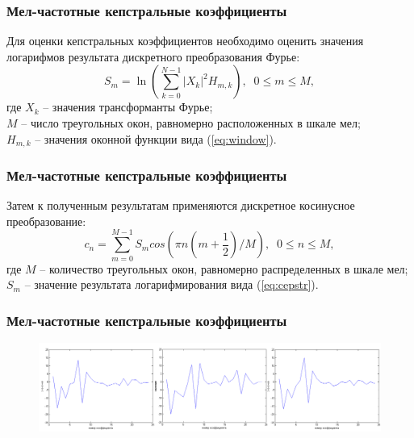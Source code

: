 \documentclass[slidestop, compress, mathserif, blackandwhite, utf8, serif, slidescentered]{beamer}
\begin{document}
 \begin{frame}[plain]
 	\frametitle{Мел-частотные кепстральные коэффициенты}
	Для оценки кепстральных коэффициентов необходимо оценить значения логарифмов результата дискретного преобразования Фурье:
	\begin{equation}
		S_m=\ln(\sum_{k=0}^{N-1}|X_k|^2 H_{m,k}), \; \; 0\leq m \le M,
		\label{eq:cepstr}
	\end{equation}
	где $X_k$ -- значения трансформанты Фурье;\\
	$M$ -- число треугольных окон, равномерно расположенных в шкале мел;\\
	$H_{m,k}$ -- значения оконной функции вида (\ref{eq:window}).

 \end{frame}

 \begin{frame}[plain]
 	\frametitle{Мел-частотные кепстральные коэффициенты}
	Затем к полученным результатам применяются дискретное косинусное преобразование:
	\begin{equation}
		c_n=\sum_{m=0}^{M-1}S_m cos(\pi n(m+\frac{1}{2})/M), \; \; 0\leq n \le M,
	\end{equation}
	где  $M$ – количество треугольных окон, равномерно распределенных в шкале мел;\\
	$S_m$ – значение результата логарифмирования вида (\ref{eq:cepstr}).

 \end{frame}

 \begin{frame}[plain]
 	\frametitle{Мел-частотные кепстральные коэффициенты}
 	\hfill
	\begin{figure}[h]
	\centering
	\includegraphics[width=\textwidth]{a_mfcc_horz.png}
	\caption{}
	\label{a_mfcc}
\end{figure}

 \end{frame}
\end{document}
